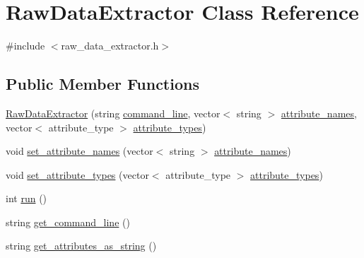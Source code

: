\hypertarget{classRawDataExtractor}{}\section{Raw\+Data\+Extractor Class Reference}
\label{classRawDataExtractor}


{\ttfamily \#include $<$raw\+\_\+data\+\_\+extractor.\+h$>$}

\subsection*{Public Member Functions}
\begin{DoxyCompactItemize}
\item 
\hyperlink{classRawDataExtractor_a5152ed0ab55f6324964cd718572fcb31}{Raw\+Data\+Extractor} (string \hyperlink{classRawDataExtractor_a17902ee3cae7c15061ef208b11b0d300}{command\+\_\+line}, vector$<$ string $>$ \hyperlink{classRawDataExtractor_a23ce52343673f63a56c5c05cf15a3859}{attribute\+\_\+names}, vector$<$ attribute\+\_\+type $>$ \hyperlink{classRawDataExtractor_a0c5d6acb054f65891526b2fe1c5d1cf3}{attribute\+\_\+types})
\item 
void \hyperlink{classRawDataExtractor_aab89e89463d22ed6289f3193aa22ce59}{set\+\_\+attribute\+\_\+names} (vector$<$ string $>$ \hyperlink{classRawDataExtractor_a23ce52343673f63a56c5c05cf15a3859}{attribute\+\_\+names})
\item 
void \hyperlink{classRawDataExtractor_aaaacbf7cd1b5bbf93fec979f570e0c69}{set\+\_\+attribute\+\_\+types} (vector$<$ attribute\+\_\+type $>$ \hyperlink{classRawDataExtractor_a0c5d6acb054f65891526b2fe1c5d1cf3}{attribute\+\_\+types})
\item 
int \hyperlink{classRawDataExtractor_a6833aa2286e27341b88c5db94ee9f4b2}{run} ()
\item 
string \hyperlink{classRawDataExtractor_a176053837936f059d1f7702ebe21c44d}{get\+\_\+command\+\_\+line} ()
\item 
string \hyperlink{classRawDataExtractor_a8f789de8730ba2d733353b94feac5a11}{get\+\_\+attributes\+\_\+as\+\_\+string} ()
\end{DoxyCompactItemize}
